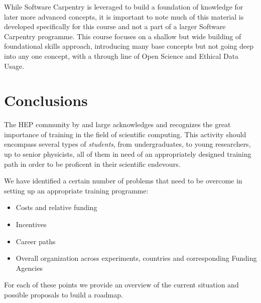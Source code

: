 \documentclass[12pt,a4paper]{article}
\begin{document}
While Software Carpentry is leveraged to build a foundation of knowledge for
later more advanced concepts, it is important to note much of this material is
developed specifically for this course and not a part of a larger Software
Carpentry programme. This course focuses on a shallow but wide building of
foundational skills approach, introducing many base concepts but not going deep
into any one concept, with a through line of Open Science and Ethical Data
Usage.

\section{Conclusions}

The HEP community by and large acknowledges and recognizes the great importance
of training in the field of scientific computing. This activity should encompass
several types of {\it students}, from undergraduates, to young researchers, up
to senior physicists, all of them in need of an appropriately designed training
path in order to be proficent in their scientific endevours.

We have identified a certain number of problems that need to be overcome in
setting up an appropriate training programme:
\begin{itemize}
    \item Costs and relative funding
    \item Incentives
    \item Career paths
    \item Overall organization across experiments, countries and 
    corresponding Funding Agencies
\end{itemize}

For each of these points we provide an overview of the current situation and possible proposals to build a roadmap.

\end{document}
